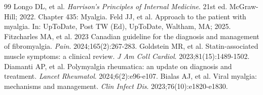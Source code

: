 \begin{thebibliography}{99}
 Longo DL, et al. \emph{Harrison's Principles of Internal Medicine}. 21st ed. McGraw-Hill; 2022. Chapter 435: Myalgia.
 Feld JJ, et al. Approach to the patient with myalgia. In: UpToDate, Post TW (Ed), UpToDate, Waltham, MA; 2025.
 Fitzcharles MA, et al. 2023 Canadian guideline for the diagnosis and management of fibromyalgia. \emph{Pain}. 2024;165(2):267-283.
 Goldstein MR, et al. Statin-associated muscle symptoms: a clinical review. \emph{J Am Coll Cardiol}. 2023;81(15):1489-1502.
 Diamanti AP, et al. Polymyalgia rheumatica: an update on diagnosis and treatment. \emph{Lancet Rheumatol}. 2024;6(2):e96-e107.
 Bialas AJ, et al. Viral myalgia: mechanisms and management. \emph{Clin Infect Dis}. 2023;76(10):e1820-e1830.
\end{thebibliography}
